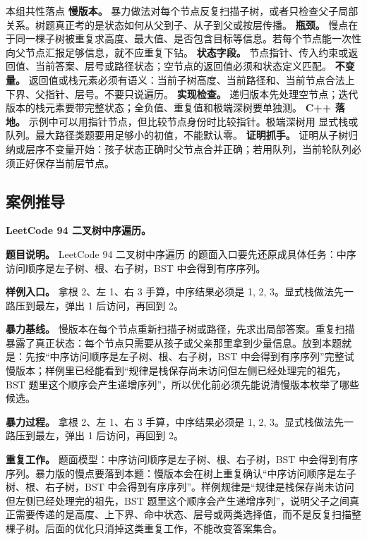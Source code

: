 \begin{principlebox}{本组共性落点}
\textbf{慢版本。} 暴力做法对每个节点反复扫描子树，或者只检查父子局部关系。树题真正考的是状态如何从父到子、从子到父或按层传播。
\textbf{瓶颈。} 慢点在于同一棵子树被重复求高度、最大值、是否包含目标等信息。若每个节点能一次性向父节点汇报足够信息，就不应重复下钻。
\textbf{状态字段。} 节点指针、传入约束或返回值、当前答案、层号或路径状态；空节点的返回值必须和状态定义匹配。
\textbf{不变量。} 返回值或栈元素必须有语义：当前子树高度、当前路径和、当前节点合法上下界、父指针、层号。不要只说遍历。
\textbf{实现检查。} 递归版本先处理空节点；迭代版本的栈元素要带完整状态；全负值、重复值和极端深树要单独测。
\textbf{C++ 落地。} 示例中可以用指针节点，但比较节点身份时比较指针。极端深树用  显式栈或队列。最大路径类题要用足够小的初值，不能默认零。
\textbf{证明抓手。} 证明从子树归纳或层序不变量开始：孩子状态正确时父节点合并正确；若用队列，当前轮队列必须正好保存当前层节点。
\end{principlebox}

\subsection{案例推导}

\noindent\textbf{LeetCode 94 二叉树中序遍历。}

\textbf{题目说明。} LeetCode 94 二叉树中序遍历 的题面入口要先还原成具体任务：中序访问顺序是左子树、根、右子树，BST 中会得到有序序列。

\textbf{样例入口。} 拿根 2、左 1、右 3 手算，中序结果必须是 1, 2, 3。显式栈做法先一路压到最左，弹出 1 后访问，再回到 2。

\textbf{暴力基线。} 慢版本在每个节点重新扫描子树或路径，先求出局部答案。重复扫描暴露了真正状态：每个节点只需要从孩子或父亲那里拿到少量信息。放到本题就是：先按“中序访问顺序是左子树、根、右子树，BST 中会得到有序序列”完整试慢版本；样例里已经能看到“规律是栈保存尚未访问但左侧已经处理完的祖先，BST 题里这个顺序会产生递增序列”，所以优化前必须先能说清慢版本枚举了哪些候选。

\textbf{暴力过程。} 拿根 2、左 1、右 3 手算，中序结果必须是 1, 2, 3。显式栈做法先一路压到最左，弹出 1 后访问，再回到 2。

\textbf{重复工作。} 题面模型：中序访问顺序是左子树、根、右子树，BST 中会得到有序序列。暴力版的慢点要落到本题：慢版本会在树上重复确认“中序访问顺序是左子树、根、右子树，BST 中会得到有序序列”。样例规律是“规律是栈保存尚未访问但左侧已经处理完的祖先，BST 题里这个顺序会产生递增序列”，说明父子之间真正需要传递的是高度、上下界、命中状态、层号或两类选择值，而不是反复扫描整棵子树。后面的优化只消掉这类重复工作，不能改变答案集合。

